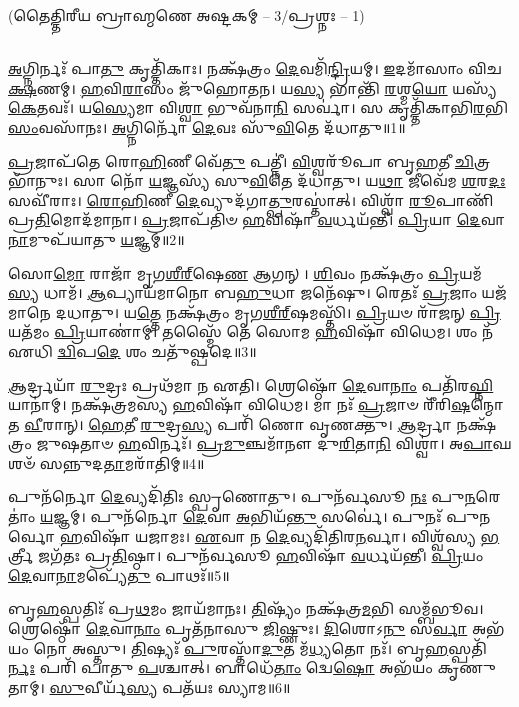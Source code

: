 
\vspace{-1ex}
\centerline{\scriptsize(𑌤𑍈𑌤𑍍𑌤𑌿𑌰𑍀𑌯 𑌬𑍍𑌰𑌾𑌹𑍍𑌮𑌣𑍇 𑌅𑌷𑍍𑌟𑌕𑌮𑍍 -- 3/𑌪𑍍𑌰𑌶𑍍𑌨𑌃 -- 1)}\mbox{}\\[-2em]

\-\ul{𑌅}\-𑌗𑍍𑌨𑌿𑌰𑍍𑌨𑌃᳴ 𑌪𑌾\-\ul{𑌤𑍁} 𑌕𑍃𑌤𑍍𑌤𑌿᳴𑌕𑌾𑌃।
𑌨𑌕𑍍𑌷᳴𑌤𑍍𑌰𑌂 \ul{𑌦𑍇}\-𑌵𑌮𑌿᳴\-\ul{𑌨𑍍𑌦𑍍𑌰𑌿}\-𑌯𑌮𑍍।
\-\ul{𑌇}\-𑌦𑌮𑌾᳴𑌸𑌾𑌂 𑌵𑌿𑌚\-\ul{𑌕𑍍𑌷}\-𑌣𑌮𑍍।
\-\ul{𑌹}\-𑌵𑌿\-\ul{𑌰𑌾}\-𑌸𑌂 𑌜𑍁᳴𑌹𑍋𑌤𑌨।
𑌯\-\ul{𑌸𑍍𑌯} 𑌭𑌾𑌨𑍍𑌤𑌿᳴ \ul{𑌰}\-𑌶𑍍𑌮\-\ul{𑌯𑍋} 𑌯𑌸𑍍𑌯᳴ \ul{𑌕𑍇}\-𑌤𑌵𑌃᳴।
𑌯\-\ul{𑌸𑍍𑌯𑍇}\-𑌮𑌾 𑌵𑌿\-\ul{𑌶𑍍𑌵𑌾} 𑌭𑍁𑌵᳴𑌨𑌾\-\ul{𑌨𑌿} 𑌸𑌰𑍍𑌵𑌾॑।
𑌸 𑌕𑍃𑌤𑍍𑌤𑌿᳴𑌕𑌾𑌭𑌿\-\-\ul{𑌰}\-𑌭𑌿\-\ul{𑌸𑌂}\-𑌵𑌸𑌾᳴𑌨𑌃।
\-\ul{𑌅}\-𑌗𑍍𑌨𑌿𑌰𑍍𑌨𑍋᳴ \ul{𑌦𑍇}\-𑌵𑌃 𑌸𑍁᳴\-\ul{𑌵𑌿}\-𑌤𑍇 𑌦᳴𑌧𑌾𑌤𑍁॥1॥ 

\-\ul{𑌪𑍍𑌰}\-𑌜𑌾𑌪᳴𑌤𑍇 𑌰𑍋\-\ul{𑌹𑌿}\-𑌣𑍀 𑌵𑍇᳴\-\ul{𑌤𑍁} 𑌪𑌤𑍍𑌨𑍀॑।
\-\ul{𑌵𑌿}\-𑌶𑍍𑌵𑌰𑍂᳴𑌪𑌾 𑌬𑍃\-\ul{𑌹}\-𑌤𑍀 \ul{𑌚𑌿}\-𑌤𑍍𑌰𑌭𑌾᳴𑌨𑍁𑌃।
𑌸𑌾 𑌨𑍋᳴ \ul{𑌯}\-𑌜𑍍𑌞𑌸𑍍𑌯᳴ 𑌸𑍁\-\ul{𑌵𑌿}\-𑌤𑍇 𑌦᳴𑌧𑌾𑌤𑍁।
𑌯\-\ul{𑌥𑌾} 𑌜𑍀𑌵𑍇᳴𑌮 \ul{𑌶}\-𑌰\-\ul{𑌦𑌃} 𑌸𑌵𑍀᳴𑌰𑌾𑌃।
\-\ul{𑌰𑍋}\-\-\ul{𑌹𑌿}\-𑌣𑍀 \ul{𑌦𑍇}\-𑌵𑍍𑌯𑍁𑌦᳴𑌗𑌾\-\ul{𑌤𑍍𑌪𑍁}\-𑌰𑌸𑍍𑌤𑌾॑𑌤𑍍।
𑌵𑌿𑌶𑍍𑌵𑌾᳴ \ul{𑌰𑍂}\-𑌪𑌾𑌣𑌿᳴ 𑌪𑍍𑌰\-\ul{𑌤𑌿}\-𑌮𑍋𑌦᳴𑌮𑌾𑌨𑌾।
\-\ul{𑌪𑍍𑌰}\-𑌜𑌾𑌪᳴𑌤𑌿𑍞 \ul{𑌹}\-𑌵𑌿𑌷𑌾᳴ \ul{𑌵}\-𑌰𑍍𑌧𑌯᳴𑌨𑍍𑌤𑍀।
\-\ul{𑌪𑍍𑌰𑌿}\-𑌯𑌾 \ul{𑌦𑍇}\-𑌵𑌾\-\ul{𑌨𑌾}\-𑌮𑍁𑌪᳴𑌯𑌾𑌤𑍁 \ul{𑌯}\-𑌜𑍍𑌞𑌮𑍍॥2॥ 

𑌸𑍋\-\ul{𑌮𑍋} 𑌰𑌾𑌜𑌾᳴ 𑌮𑍃𑌗\-\ul{𑌶𑍀}\-\ul{𑌰𑍍}‌𑌷𑍇\-\ul{𑌣} 𑌆𑌗𑌨𑍍।
\-\ul{𑌶𑌿}\-𑌵𑌂 𑌨𑌕𑍍𑌷᳴𑌤𑍍𑌰𑌂 \ul{𑌪𑍍𑌰𑌿}\-𑌯𑌮᳴\-\ul{𑌸𑍍𑌯} 𑌧𑌾𑌮᳴।
\-\ul{𑌆}\-𑌪𑍍𑌯𑌾𑌯᳴𑌮𑌾𑌨𑍋 𑌬\-\ul{𑌹𑍁}\-𑌧𑌾 𑌜𑌨𑍇᳴𑌷𑍁।
𑌰𑍇𑌤𑌃᳴ \ul{𑌪𑍍𑌰}\-𑌜𑌾𑌂 𑌯𑌜᳴𑌮𑌾𑌨𑍇 𑌦𑌧𑌾𑌤𑍁।
𑌯\-\ul{𑌤𑍍𑌤𑍇} 𑌨𑌕𑍍𑌷᳴𑌤𑍍𑌰𑌂 𑌮𑍃𑌗\-\ul{𑌶𑍀}\-\ul{𑌰𑍍}‌𑌷𑌮𑌸𑍍𑌤𑌿᳴।
\-\ul{𑌪𑍍𑌰𑌿}\-𑌯𑍞 𑌰𑌾᳴𑌜𑌨𑍍 \ul{𑌪𑍍𑌰𑌿}\-𑌯𑌤᳴𑌮𑌂 \ul{𑌪𑍍𑌰𑌿}\-𑌯𑌾𑌣𑌾॑𑌮𑍍।
𑌤𑌸𑍍𑌮𑍈᳴ 𑌤𑍇 𑌸𑍋𑌮 \ul{𑌹}\-𑌵𑌿𑌷𑌾᳴ 𑌵𑌿𑌧𑍇𑌮।
𑌶𑌂 𑌨᳴ 𑌏𑌧𑌿 \ul{𑌦𑍍𑌵𑌿}\-𑌪\-\ul{𑌦𑍇} 𑌶𑌂 𑌚𑌤𑍁᳴𑌷𑍍𑌪𑌦𑍇॥3॥ 

\-\ul{𑌆}\-𑌰𑍍𑌦𑍍𑌰𑌯𑌾᳴ \ul{𑌰𑍁}\-𑌦𑍍𑌰𑌃 𑌪𑍍𑌰𑌥᳴𑌮𑌾 𑌨 𑌏𑌤𑌿।
𑌶𑍍𑌰𑍇𑌷𑍍𑌠𑍋᳴ \ul{𑌦𑍇}\-𑌵𑌾\-\ul{𑌨𑌾𑌂} 𑌪𑌤𑌿᳴𑌰\-\ul{𑌘𑍍𑌨𑌿}\-𑌯𑌾𑌨𑌾॑𑌮𑍍।
𑌨𑌕𑍍𑌷᳴𑌤𑍍𑌰𑌮𑌸𑍍𑌯 \ul{𑌹}\-𑌵𑌿𑌷𑌾᳴ 𑌵𑌿𑌧𑍇𑌮।
𑌮𑌾 𑌨𑌃᳴ \ul{𑌪𑍍𑌰}\-𑌜𑌾𑍞 𑌰𑍀᳴𑌰𑌿\-\ul{𑌷}\-𑌨𑍍𑌮𑍋𑌤 \ul{𑌵𑍀}\-𑌰𑌾𑌨𑍍।
\-\ul{𑌹𑍇}\-𑌤𑍀 \ul{𑌰𑍁}\-𑌦𑍍𑌰\-\ul{𑌸𑍍𑌯} 𑌪𑌰𑌿᳴ 𑌣𑍋 𑌵𑍃𑌣𑌕𑍍𑌤𑍁।
\-\ul{𑌆}\-𑌰𑍍𑌦𑍍𑌰𑌾 𑌨𑌕𑍍𑌷᳴𑌤𑍍𑌰𑌂 𑌜𑍁𑌷𑌤𑌾𑍞 \ul{𑌹}\-𑌵𑌿𑌰𑍍𑌨𑌃᳴।
\-\ul{𑌪𑍍𑌰}\-\-\ul{𑌮𑍁}\-𑌞𑍍𑌚𑌮𑌾᳴𑌨𑍗 𑌦𑍁\-\ul{𑌰𑌿}\-𑌤𑌾\-\ul{𑌨𑌿} 𑌵𑌿𑌶𑍍𑌵𑌾॑।
𑌅\-\ul{𑌪𑌾}\-𑌘𑌶𑍞᳴ 𑌸𑌨𑍍𑌨𑍁𑌦\-\ul{𑌤𑌾}\-𑌮𑌰𑌾᳴𑌤𑌿𑌮𑍍॥4॥ 

𑌪𑍁𑌨᳴𑌰𑍍𑌨𑍋 \ul{𑌦𑍇}\-𑌵𑍍𑌯𑌦𑌿᳴𑌤𑌿𑌃 𑌸𑍍𑌪𑍃𑌣𑍋𑌤𑍁।
𑌪𑍁𑌨᳴𑌰𑍍𑌵𑌸𑍂 \ul{𑌨𑌃} 𑌪𑍁\-\ul{𑌨}\-𑌰𑍇𑌤𑌾𑌂॑ \ul{𑌯}\-𑌜𑍍𑌞𑌮𑍍।
𑌪𑍁𑌨᳴𑌰𑍍𑌨𑍋 \ul{𑌦𑍇}\-𑌵𑌾 \ul{𑌅}\-𑌭𑌿𑌯᳴\-\ul{𑌨𑍍𑌤𑍁} 𑌸𑌰𑍍𑌵𑍇॑।
𑌪𑍁𑌨𑌃᳴ 𑌪𑍁𑌨𑌰𑍍𑌵𑍋 \ul{𑌹}\-𑌵𑌿𑌷𑌾᳴ 𑌯𑌜𑌾𑌮𑌃।
\-\ul{𑌏}\-𑌵𑌾 𑌨 \ul{𑌦𑍇}\-𑌵𑍍𑌯𑌦𑌿᳴𑌤𑌿𑌰\-\ul{𑌨}\-𑌰𑍍𑌵𑌾।
𑌵𑌿𑌶𑍍𑌵᳴𑌸𑍍𑌯 \ul{𑌭}\-𑌰𑍍𑌤𑍍𑌰𑍀 𑌜𑌗᳴𑌤𑌃 𑌪𑍍𑌰\-\ul{𑌤𑌿}\-𑌷𑍍𑌠𑌾।
𑌪𑍁𑌨᳴𑌰𑍍𑌵𑌸𑍂 \ul{𑌹}\-𑌵𑌿𑌷𑌾᳴ \ul{𑌵}\-𑌰𑍍𑌧𑌯᳴𑌨𑍍𑌤𑍀।
\-\ul{𑌪𑍍𑌰𑌿}\-𑌯𑌂 \ul{𑌦𑍇}\-𑌵𑌾\-\ul{𑌨𑌾}\-𑌮𑌪𑍍𑌯𑍇᳴\-\ul{𑌤𑍁} 𑌪𑌾𑌥𑌃᳴॥5॥ 

𑌬𑍃\-\ul{𑌹}\-𑌸𑍍𑌪𑌤𑌿𑌃᳴ 𑌪𑍍𑌰\-\ul{𑌥}\-𑌮𑌂 𑌜𑌾𑌯᳴𑌮𑌾𑌨𑌃।
\-\ul{𑌤𑌿}\-𑌷𑍍𑌯𑌂᳴ 𑌨𑌕𑍍𑌷᳴𑌤𑍍𑌰\-\ul{𑌮}\-𑌭𑌿 𑌸𑌮𑍍𑌬᳴𑌭𑍂𑌵।
𑌶𑍍𑌰𑍇𑌷𑍍𑌠𑍋᳴ \ul{𑌦𑍇}\-𑌵𑌾\-\ul{𑌨𑌾𑌂} 𑌪𑍃𑌤᳴𑌨𑌾𑌸𑍁 \ul{𑌜𑌿}\-𑌷𑍍𑌣𑍁𑌃।
\-\ul{𑌦𑌿}\-𑌶𑍋𑌽\-\ul{𑌨𑍁} 𑌸\-\ul{𑌰𑍍𑌵𑌾} 𑌅𑌭᳴𑌯𑌂 𑌨𑍋 𑌅𑌸𑍍𑌤𑍁।
\-\ul{𑌤𑌿}\-𑌷𑍍𑌯𑌃᳴ \ul{𑌪𑍁}\-𑌰𑌸𑍍𑌤𑌾᳴\-\ul{𑌦𑍁}\-𑌤 𑌮᳴\-\ul{𑌧𑍍𑌯}\-𑌤𑍋 𑌨𑌃᳴।
𑌬𑍃\-\ul{𑌹}\-𑌸𑍍𑌪𑌤𑌿᳴\-\ul{𑌰𑍍𑌨𑌃} 𑌪𑌰𑌿᳴ 𑌪𑌾𑌤𑍁 \ul{𑌪}\-𑌶𑍍𑌚𑌾𑌤𑍍।
𑌬𑌾𑌧𑍇᳴\-\ul{𑌤𑌾𑌂} 𑌦𑍍𑌵𑍇\-\ul{𑌷𑍋} 𑌅𑌭᳴𑌯𑌂 𑌕𑍃𑌣𑍁𑌤𑌾𑌮𑍍।
\-\ul{𑌸𑍁}\-𑌵𑍀𑌰𑍍𑌯᳴\-\ul{𑌸𑍍𑌯} 𑌪𑌤᳴𑌯𑌃 𑌸𑍍𑌯𑌾𑌮॥6॥ 

